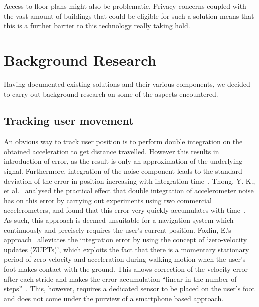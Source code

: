 \documentclass[12pt,a4paper]{report}
\begin{document}
 Access to floor plans might also be problematic. Privacy concerns coupled with the vast amount of buildings that could be eligible for such a solution means that this is a further barrier to this technology really taking hold.

\chapter{Background Research}

Having documented existing solutions and their various components, we decided to carry out background research on some of the aspects encountered.

 \section{Tracking user movement}

An obvious way to track user position is to perform double integration on the obtained acceleration to get distance travelled. However this results in introduction of error, as the result is only an approximation of the underlying signal. Furthermore, integration of the noise component leads to the standard deviation of the error in position increasing with integration time~\cite[p.73]{integrationError}. Thong, Y. K., et al.~\cite{integrationErrorPractical} analysed the practical effect that double integration of accelerometer noise has on this error by carrying out experiments using two commercial accelerometers, and found that this error very quickly accumulates with time~\cite[p.1168]{integrationErrorPractical}. As such, this approach is deemed unsuitable for a navigation system which continuously and precisely requires the user’s current position. Foxlin, E.'s approach~\cite{foxlin2005pedestrian} alleviates the integration error by using the concept of `zero-velocity updates (ZUPTs)’, which exploits the fact that there is a momentary stationary period of zero velocity and acceleration during walking motion when the user’s foot makes contact with the ground. This allows correction of the velocity error after each stride and makes the error accumulation ``linear in the number of steps''~\cite[p.38]{foxlin2005pedestrian}. This, however, requires a dedicated sensor to be placed on the user’s foot and does not come under the purview of a smartphone based approach. 
\end{document}
